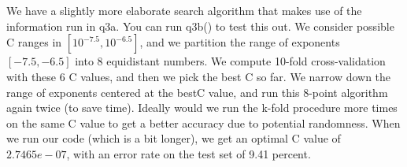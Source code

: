 \documentclass[11pt]{article}
\begin{document}
\\\\
We have a slightly more elaborate search algorithm that makes use of the information run in q3a. You can run q3b() to test this out. We consider possible C ranges in $[10^{-7.5}, 10^{-6.5}]$, and we partition the range of exponents $[-7.5,-6.5]$ into 8 equidistant numbers. We compute 10-fold cross-validation with these 6 C values, and then we pick the best C so far. We narrow down the range of exponents centered at the bestC value, and run this 8-point algorithm again twice (to save time). Ideally would we run the k-fold procedure more times on the same C value to get a better accuracy due to potential randomness. When we run our code (which is a bit longer), we get an optimal C value of $2.7465e-07$, with an error rate on the test set of 9.41 percent.
\end{document}

